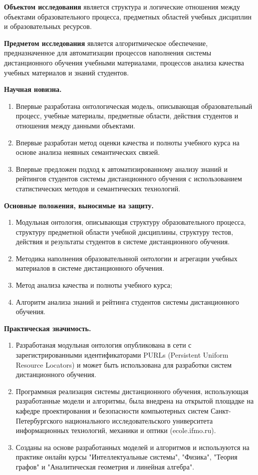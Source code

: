 \textbf{Объектом исследования} является структура и логические отношения между объектами образовательного процесса, предметных областей учебных дисциплин и образовательных ресурсов.  

\textbf{Предметом исследования} является алгоритмическое обеспечение, предназначенное для автоматизации процессов наполнения системы дистанционного обучения учебными материалами, процессов анализа качества учебных материалов и знаний студентов. 

\textbf{Научная новизна.}
\begin{enumerate}
 \item Впервые разработана онтологическая модель, описывающая образовательный процесс, учебные материалы, предметные области, действия студентов и отношения между данными объектами. 
 \item Впервые разработан метод оценки качества и полноты учебного курса на основе анализа неявных семантических связей.
 \item Впервые предложен подход к автоматизированному анализу знаний и рейтингов студентов системы дистанционного обучения с использованием статистических методов и семантических технологий.
\end{enumerate}

\textbf{Основные положения, выносимые на защиту.}
\begin{enumerate}
 \item Модульная онтология, описывающая структуру образовательного процесса, структуру предметной области учебной дисциплины, структуру тестов, действия и результаты студентов в системе дистанционного обучения.
 \item Методика наполнения образовательнной онтологии и агрегации учебных материалов в системе дистанционного обучения.
 \item Метод анализа качества и полноты учебного курса;
 \item Алгоритм анализа знаний и рейтинга студентов системы дистанционного обучения.
 \end{enumerate}


\textbf{Практическая значимость.}
\begin{enumerate}
 \item Разработаная модульная онтология опубликована в сети с зарегистрированными идентификаторами PURLs (Persistent Uniform Resource Locators) и может быть использована для разработки систем дистанционного обучения.
 \item Программная реализация системы дистанционного обучения, использующая разработанные модели и алгоритмы, была внедрена на открытой площадке на кафедре проектирования и безопасности компьютерных систем Санкт-Петербургского национального исследовательского университета информационных технологий, механики и оптики (ecole.ifmo.ru). 
 \item Созданы на основе разработанных моделей и алгоритмов и используются на практике онлайн курсы 
"Интеллектуальные системы", "Физика", "Теория графов" и "Аналитическая геометрия и линейная алгебра".
 \end{enumerate}
 
